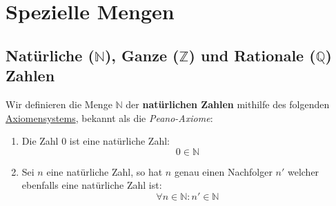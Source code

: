 \documentclass[../../main.tex]{subfiles}
\begin{document}
	
	\chapter{Spezielle Mengen}
	
		\section{Natürliche ($\mathbb{N}$), Ganze ($\mathbb{Z}$) und Rationale ($\mathbb{Q}$) Zahlen}
		
		\begin{definition}
			\label{def:NatürlicheZahlen}
			Wir definieren die Menge $\mathbb{N}$ der \textbf{natürlichen Zahlen} mithilfe des folgenden \hyperref[def:Axiomensystem]{Axiomensystems}, bekannt als die \textit{Peano-Axiome}:
			\begin{enumerate}
				\item Die Zahl 0 ist eine natürliche Zahl: $$0 \in \mathbb{N}$$
				\item Sei $n$ eine natürliche Zahl, so hat $n$ genau einen Nachfolger $n'$ welcher ebenfalls eine natürliche Zahl ist: $$\forall n \in \mathbb{N}: n' \in \mathbb{N}$$

\end{enumerate}
\end{definition}
\end{document}

